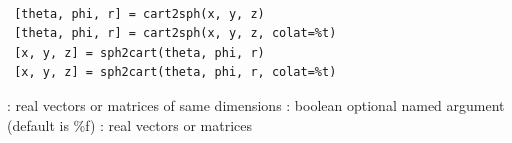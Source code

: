 
\begin{mandesc}
   \\
\end{mandesc}

\begin{calling_sequence}
\begin{verbatim}
 [theta, phi, r] = cart2sph(x, y, z)
 [theta, phi, r] = cart2sph(x, y, z, colat=%t)
 [x, y, z] = sph2cart(theta, phi, r)
 [x, y, z] = sph2cart(theta, phi, r, colat=%t)
\end{verbatim}
\end{calling_sequence}

\begin{parameters}
  \begin{varlist}
   : real vectors or matrices of same dimensions
   : boolean optional named argument (default is \%f)
   : real vectors or matrices
  \end{varlist}
\end{parameters}

